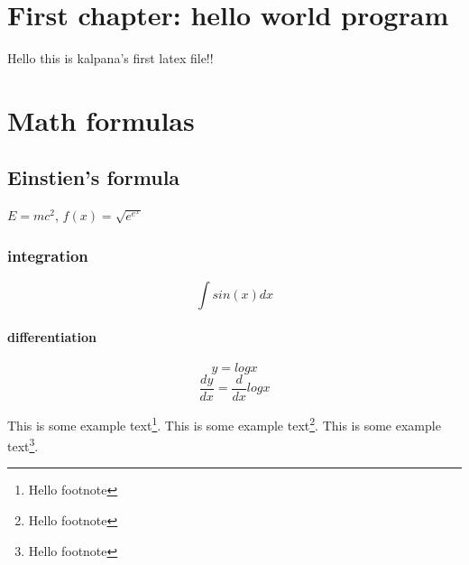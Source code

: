 \documentclass{report}
\begin{document}
\tableofcontents

\chapter{First chapter: hello world program}
Hello this is kalpana's first latex file!!

\chapter{Math formulas}
\section{Einstien's formula}
$E = mc^2 $, $ f(x) = \sqrt{e^{e^x}} $
\subsection{integration}
$$\int{sin(x)}d{x} $$
\subsubsection{differentiation}
$$ y=logx $$
$$ \frac{d{y}}{d{x}}=\frac{d}{d{x}}logx $$



This is some example text\footnote{\label{myfootnote}Hello footnote}.
This is some example text\footnote{\label{mfootnote}Hello footnote}.
This is some example text\footnote{\label{newfootnote}Hello footnote}.
\end{document}
